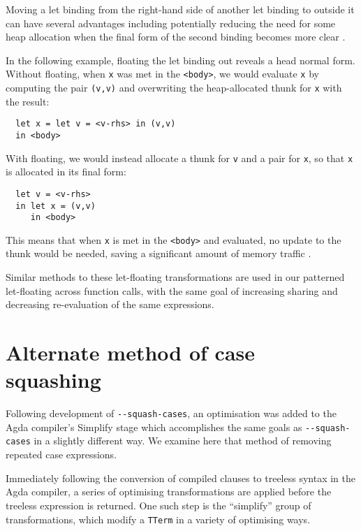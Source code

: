 \begin{enumerate}
Moving a let binding from the right-hand side of another let binding to outside it can have several advantages including potentially reducing the need for some heap allocation when the final form of the second binding becomes more clear \citep{jones1996}.

In the following example, floating the let binding out reveals a head normal form. Without floating, when \lstinline{x} was met in the \lstinline{<body>}, we would evaluate \lstinline{x} by computing the pair \lstinline{(v,v)} and overwriting the heap-allocated thunk for \lstinline{x} with the result:

\begin{lstlisting}
  let x = let v = <v-rhs> in (v,v)
  in <body>
\end{lstlisting}

With floating, we would instead allocate a thunk for \lstinline{v} and a pair for \lstinline{x}, so that \lstinline{x} is allocated in its final form:

\begin{lstlisting}
  let v = <v-rhs>
  in let x = (v,v)
     in <body>
\end{lstlisting}

This means that when \lstinline{x} is met in the \lstinline{<body>} and evaluated, no update to the thunk would be needed, saving a significant amount of memory traffic \citep{jones1996}.

\end{enumerate}

Similar methods to these let-floating transformations are used in our patterned let-floating across function calls, with the same goal of increasing sharing and decreasing re-evaluation of the same expressions.

\section{Alternate method of case squashing}
\label{sub:alternate_case_squash}

Following development of \texttt{-{}-squash-cases}, an optimisation was added to the Agda compiler's Simplify stage which accomplishes the same goals as \texttt{-{}-squash-cases} in a slightly different way. We examine here that method of removing repeated case expressions.

Immediately following the conversion of compiled clauses to treeless syntax in the Agda compiler, a series of optimising transformations are applied before the treeless expression is returned. One such step is the ``simplify'' group of transformations, which modify a \lstinline{TTerm} in a variety of optimising ways.

